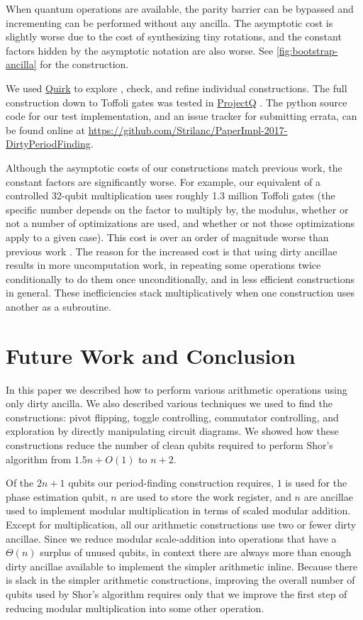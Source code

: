 \documentclass[twocolumn,longbibliography]{quantumarticle-customized}
\begin{document}
When quantum operations are available, the parity barrier can be bypassed and incrementing can be performed without any ancilla.
The asymptotic cost is slightly worse due to the cost of synthesizing tiny rotations, and the constant factors hidden by the asymptotic notation are also worse.
See \autoref{fig:bootstrap-ancilla} for the construction.

We used \href{https://github.com/Strilanc/Quirk}{Quirk} \cite{quirk2016} to explore \cite{victor2013}, check, and refine individual constructions.
The full construction down to Toffoli gates was tested in \href{https://github.com/ProjectQ-Framework/ProjectQ}{ProjectQ} \cite{projq2016}.
The python source code for our test implementation, and an issue tracker for submitting errata, can be found online at \href{https://github.com/Strilanc/PaperImpl-2017-DirtyPeriodFinding}{https://github.com/Strilanc/PaperImpl-2017-DirtyPeriodFinding}.

Although the asymptotic costs of our constructions match previous work, the constant factors are significantly worse.
For example, our equivalent of a controlled 32-qubit multiplication uses roughly 1.3 million Toffoli gates (the specific number depends on the factor to multiply by, the modulus, whether or not a number of optimizations are used, and whether or not those optimizations apply to a given case).
This cost is over an order of magnitude worse than previous work \cite{haner2016}.
The reason for the increased cost is that using dirty ancillae results in more uncomputation work, in repeating some operations twice conditionally to do them once unconditionally, and in less efficient constructions in general.
These inefficiencies stack multiplicatively when one construction uses another as a subroutine.


\section{Future Work and Conclusion} \label{sec:conclusion}

In this paper we described how to perform various arithmetic operations using only dirty ancilla.
We also described various techniques we used to find the constructions: pivot flipping, toggle controlling, commutator controlling, and exploration by directly manipulating circuit diagrams.
We showed how these constructions reduce the number of clean qubits required to perform Shor's algorithm from $1.5n+O(1)$ to $n+2$.

Of the $2n+1$ qubits our period-finding construction requires, $1$ is used for the phase estimation qubit, $n$ are used to store the work register, and $n$ are ancillae used to implement modular multiplication in terms of scaled modular addition.
Except for multiplication, all our arithmetic constructions use two or fewer dirty ancillae.
Since we reduce modular scale-addition into operations that have a $\Theta(n)$ surplus of unused qubits, in context there are always more than enough dirty ancillae available to implement the simpler arithmetic inline.
Because there is slack in the simpler arithmetic constructions, improving the overall number of qubits used by Shor's algorithm requires only that we improve the first step of reducing modular multiplication into some other operation.
\end{document}
